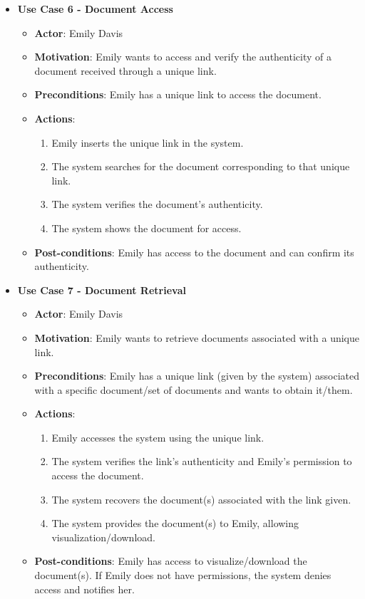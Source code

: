 \documentclass[a4paper,11pt]{article}
\begin{document}
\begin{itemize}
            \item \textbf{Use Case 6 - Document Access}
            \begin{itemize}
                \item \textbf{Actor}: Emily Davis
                \item \textbf{Motivation}: Emily wants to access and verify the authenticity of a document received through a unique link.
                \item \textbf{Preconditions}: Emily has a unique link to access the document.
                \item \textbf{Actions}:
                \begin{enumerate}
                    \item Emily inserts the unique link in the system.
                    \item The system searches for the document corresponding to that unique link.
                    \item The system verifies the document’s authenticity.
                    \item The system shows the document for access.
                \end{enumerate}
                \item \textbf{Post-conditions}: Emily has access to the document and can confirm its authenticity.
            \end{itemize}
            
            \item \textbf{Use Case 7 - Document Retrieval}
            \begin{itemize}
                \item \textbf{Actor}: Emily Davis
                \item \textbf{Motivation}: Emily wants to retrieve documents associated with a unique link.
                \item \textbf{Preconditions}: Emily has a unique link (given by the system) associated with a specific document/set of documents and wants to obtain it/them.
                \item \textbf{Actions}:
                \begin{enumerate}
                    \item Emily accesses the system using the unique link.
                    \item The system verifies the link’s authenticity and Emily’s permission to access the document.
                    \item The system recovers the document(s) associated with the link given.
                    \item The system provides the document(s) to Emily, allowing visualization/download.
                \end{enumerate}
                \item \textbf{Post-conditions}: Emily has access to visualize/download the document(s). If Emily does not have permissions, the system denies access and notifies her.
            \end{itemize}
            

\end{itemize}
\end{document}
